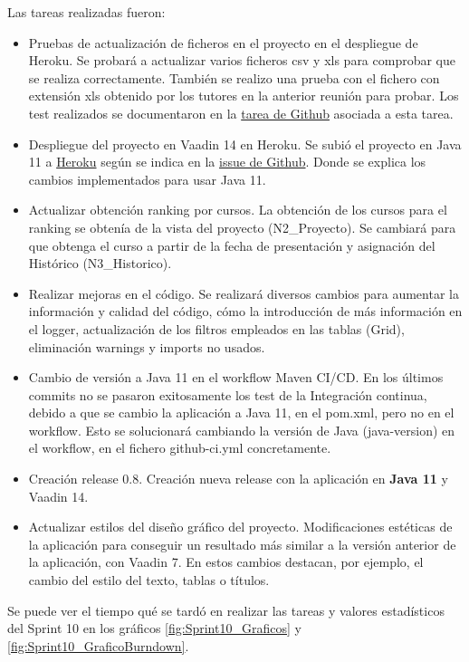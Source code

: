 Las tareas realizadas fueron:
\begin{itemize}
	\item Pruebas de actualización de ficheros en el proyecto en el despliegue de Heroku. 
		Se probará a actualizar varios ficheros csv y xls para comprobar que se realiza correctamente. También se realizo una prueba con el fichero con extensión xls obtenido por los tutores en la anterior reunión para probar. Los test realizados se documentaron en la \href{https://github.com/dbo1001/Gestor-TFG-2021/issues/114}{tarea de Github} asociada a esta tarea.
	\item Despliegue del proyecto en Vaadin 14 en Heroku. 
		Se subió el proyecto en Java 11 a \href{https://gestor-tfg-2021.herokuapp.com/}{Heroku} según se indica en la \href{https://github.com/dbo1001/Gestor-TFG-2021/issues/112}{issue de Github}. Donde se explica los cambios implementados para usar Java 11.
	\item Actualizar obtención ranking por cursos.
		La obtención de los cursos para el ranking se obtenía de la vista del proyecto (N2\_Proyecto). Se cambiará para que obtenga el curso a partir de la fecha de presentación y asignación del Histórico (N3\_Historico).
	\item Realizar mejoras en el código.
		Se realizará diversos cambios para aumentar la información y calidad del código, cómo la introducción de más información en el logger, actualización de los filtros empleados en las tablas (Grid), eliminación warnings y imports no usados.
	\item Cambio de versión a Java 11 en el workflow Maven CI/CD.
		En los últimos commits no se pasaron exitosamente los test de la Integración continua, debido a que se cambio la aplicación a Java 11, en el pom.xml, pero no en el workflow. Esto se solucionará cambiando la versión de Java (java-version) en el workflow, en el fichero github-ci.yml concretamente.
	\item Creación release 0.8. 
		Creación nueva release con la aplicación en \textbf{Java 11} y Vaadin 14.
	\item Actualizar estilos del diseño gráfico del proyecto.
		Modificaciones estéticas de la aplicación para conseguir un resultado más similar a la versión anterior de la aplicación, con Vaadin 7. En estos cambios destacan, por ejemplo, el cambio del estilo del texto, tablas o títulos.
	
\end{itemize}

Se puede ver el tiempo qué se tardó en realizar las tareas y valores estadísticos del Sprint 10 en los gráficos \ref{fig:Sprint10_Graficos} y \ref{fig:Sprint10_GraficoBurndown}.

